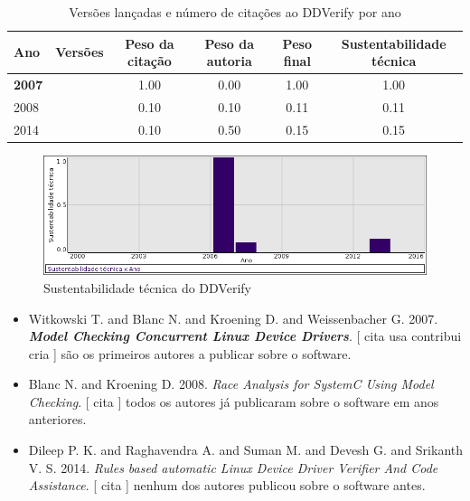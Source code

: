 \begin{table}[H]
\caption{Versões lançadas e número de citações ao DDVerify por ano}
\centering
\begin{tabular}{| l | c | c | c | c | c |}
  \hline
  Ano & Versões & Peso da citação & Peso da autoria & Peso final & Sustentabilidade técnica \\
  \hline
            {\bf 2007}
          &
          
          &
          1.00
          &
          0.00
          &
          1.00
          &
            {\color{blue} 1.00}
          \\
\hline
            2008
          &
          
          &
          0.10
          &
          0.10
          &
          0.11
          &
            {\color{red} 0.11}
          \\
\hline
            2014
          &
          
          &
          0.10
          &
          0.50
          &
          0.15
          &
            {\color{red} 0.15}
          \\
\hline
\end{tabular}
\end{table}

\begin{figure}[h]
  \center
  \includegraphics[scale=0.50]{result-documents/charts/ddverify.png}
  \caption{Sustentabilidade técnica do DDVerify}
\end{figure}


\begin{itemize}
\item Witkowski T. and Blanc N. and Kroening D. and Weissenbacher G.
      2007.
        \textbf{\textit{ Model Checking Concurrent Linux Device Drivers}}.
      [
          cita
          usa
          contribui
          cria
      ]
são os primeiros autores a publicar sobre o software.
\item Blanc N. and Kroening D.
      2008.
        \textit{ Race Analysis for SystemC Using Model Checking}.
      [
          cita
      ]
todos os autores já publicaram sobre o software em anos anteriores.
\item Dileep P. K. and Raghavendra A. and Suman M. and Devesh G. and Srikanth V. S.
      2014.
        \textit{ Rules based automatic Linux Device Driver Verifier And Code Assistance}.
      [
          cita
      ]
nenhum dos autores publicou sobre o software antes.
\end{itemize}
